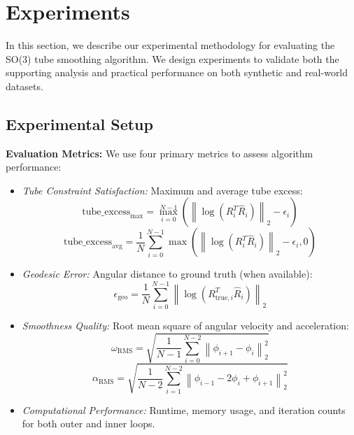 \section{Experiments}

In this section, we describe our experimental methodology for evaluating the SO(3) tube smoothing algorithm. We design experiments to validate both the supporting analysis and practical performance on both synthetic and real-world datasets.

\subsection{Experimental Setup}

\textbf{Evaluation Metrics:} We use four primary metrics to assess algorithm performance:

\begin{itemize}
\item \textit{Tube Constraint Satisfaction:} Maximum and average tube excess:
\begin{equation}
\text{tube\_excess}_{\text{max}} = \max_{i=0}^{N-1} \left( \left\| \log(R_i^T \hat{R}_i) \right\|_2 - \epsilon_i \right)
\end{equation}
\begin{equation}
\text{tube\_excess}_{\text{avg}} = \frac{1}{N} \sum_{i=0}^{N-1} \max\left( \left\| \log(R_i^T \hat{R}_i) \right\|_2 - \epsilon_i, 0 \right)
\end{equation}

\item \textit{Geodesic Error:} Angular distance to ground truth (when available):
\begin{equation}
\epsilon_{\text{geo}} = \frac{1}{N} \sum_{i=0}^{N-1} \left\| \log(R_{\text{true},i}^T \hat{R}_i) \right\|_2
\end{equation}

\item \textit{Smoothness Quality:} Root mean square of angular velocity and acceleration:
\begin{equation}
\omega_{\text{RMS}} = \sqrt{\frac{1}{N-1} \sum_{i=0}^{N-2} \left\| \phi_{i+1} - \phi_i \right\|_2^2}
\end{equation}
\begin{equation}
\alpha_{\text{RMS}} = \sqrt{\frac{1}{N-2} \sum_{i=1}^{N-2} \left\| \phi_{i-1} - 2\phi_i + \phi_{i+1} \right\|_2^2}
\end{equation}

\item \textit{Computational Performance:} Runtime, memory usage, and iteration counts for both outer and inner loops.
\end{itemize}

